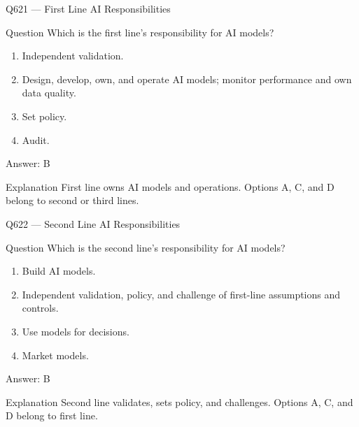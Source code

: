 \documentclass[aspectratio=169,8pt]{beamer}
\begin{document}
	\begin{frame}{Q621 --- First Line AI Responsibilities}
		\begin{block}{Question}
			Which is the first line's responsibility for AI models?
			\begin{enumerate}
				\item Independent validation.
				\item Design, develop, own, and operate AI models; monitor performance and own data quality.
				\item Set policy.
				\item Audit.
			\end{enumerate}
		\end{block}
		\begin{exampleblock}{Answer: B}\end{exampleblock}
		\begin{block}{Explanation}
			First line owns AI models and operations. Options A, C, and D belong to second or third lines.
		\end{block}
	\end{frame}
	
	\begin{frame}{Q622 --- Second Line AI Responsibilities}
		\begin{block}{Question}
			Which is the second line's responsibility for AI models?
			\begin{enumerate}
				\item Build AI models.
				\item Independent validation, policy, and challenge of first-line assumptions and controls.
				\item Use models for decisions.
				\item Market models.
			\end{enumerate}
		\end{block}
		\begin{exampleblock}{Answer: B}\end{exampleblock}
		\begin{block}{Explanation}
			Second line validates, sets policy, and challenges. Options A, C, and D belong to first line.
		\end{block}
	\end{frame}
	
\end{document}
